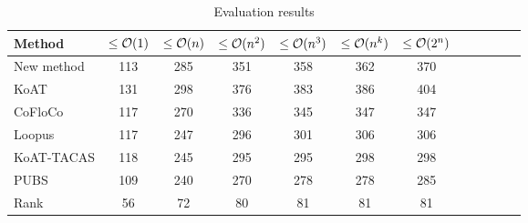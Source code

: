 \begin{table}
  \begin{center}
    \label{tab:evaluation}
    \begin{tabular}{l|c|c|c|c|c|c|c|c|c|c|c}
      Method & $\leq\mathcal{O}(1)$ & $\leq\mathcal{O}(n)$ & $\leq\mathcal{O}(n^2)$ & $\leq\mathcal{O}(n^3)$ & $\leq\mathcal{O}(n^k)$ & $\leq\mathcal{O}(2^n)$\\
      \hline
      New method & 113 & 285 & 351 & 358 & 362 & 370 \\
      KoAT       & 131 & 298 & 376 & 383 & 386 & 404 \\
      CoFloCo    & 117 & 270 & 336 & 345 & 347 & 347 \\
      Loopus     & 117 & 247 & 296 & 301 & 306 & 306 \\
      KoAT-TACAS & 118 & 245 & 295 & 295 & 298 & 298 \\
      PUBS       & 109 & 240 & 270 & 278 & 278 & 285 \\
      Rank       & 56  &  72 &  80 &  81 &  81 &  81 \\
    \end{tabular}
  \end{center}
  \caption{Evaluation results}
\end{table}

